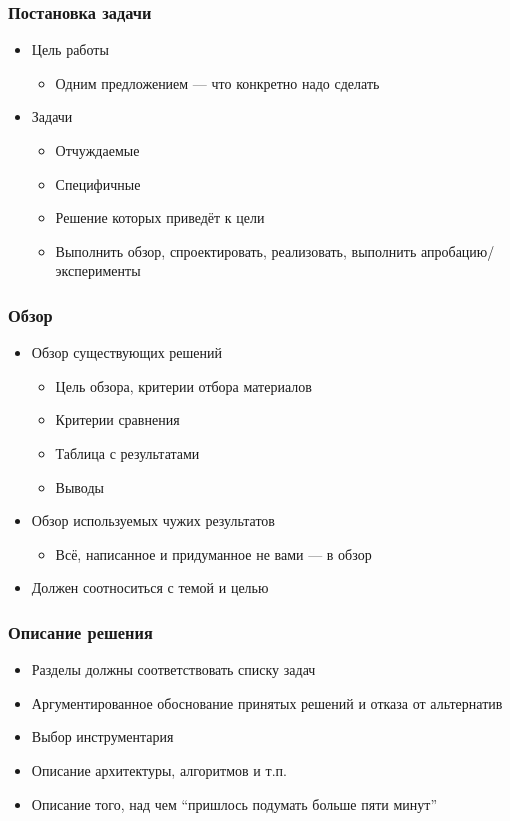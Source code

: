\documentclass[xetex,mathserif,serif]{beamer}
\begin{document}
    \begin{frame}
        \frametitle{Постановка задачи}
        \begin{itemize}
            \item Цель работы
            \begin{itemize}
                \item Одним предложением --- что конкретно надо сделать
            \end{itemize}
            \item Задачи
            \begin{itemize}
                \item Отчуждаемые
                \item Специфичные
                \item Решение которых приведёт к цели
                \item Выполнить обзор, спроектировать, реализовать, выполнить апробацию/эксперименты
            \end{itemize}
        \end{itemize}
    \end{frame}

    \begin{frame}
        \frametitle{Обзор}
        \begin{itemize}
            \item Обзор существующих решений
            \begin{itemize}
                \item Цель обзора, критерии отбора материалов
                \item Критерии сравнения
                \item Таблица с результатами
                \item Выводы
            \end{itemize}
            \item Обзор используемых чужих результатов
            \begin{itemize}
                \item Всё, написанное и придуманное не вами --- в обзор
            \end{itemize}
            \item Должен соотноситься с темой и целью
        \end{itemize}
    \end{frame}

    \begin{frame}
        \frametitle{Описание решения}
        \begin{itemize}
            \item Разделы должны соответствовать списку задач
            \item Аргументированное обоснование принятых решений и отказа от альтернатив
            \item Выбор инструментария
            \item Описание архитектуры, алгоритмов и т.п.
            \item Описание того, над чем \enquote{пришлось подумать больше пяти минут}
        \end{itemize}
    \end{frame}
\end{document}
